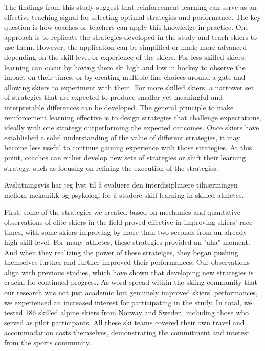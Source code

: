 The findings from this study suggest that reinforcement learning can serve as an effective teaching signal for selecting optimal strategies and performance. The key question is how coaches or teachers can apply this knowledge in practice. One approach is to replicate the strategies developed in the study and teach skiers to use them. However, the application can be simplified or made more advanced depending on the skill level or experience of the skiers. For less skilled skiers, learning can occur by having them ski high and low in hockey to observe the impact on their times, or by creating multiple line choices around a gate and allowing skiers to experiment with them. For more skilled skiers, a narrower set of strategies that are expected to produce smaller yet meaningful and interpretable differences can be developed. The general principle to make reinforcement learning effective is to design strategies that challenge expectations, ideally with one strategy outperforming the expected outcomes. Once skiers have established a solid understanding of the value of different strategies, it may become less useful to continue gaining experience with those strategies. At this point, coaches can either develop new sets of strategies or shift their learning strategy, such as focusing on refining the execution of the strategies. 




Avslutningsvis har jeg lyst til å evaluere den interdisiplinære tilnærmingen mellom mekanikk og psykologi for å studere skill learning in skilled athletes. 


First, some of the strategies we created based on mechanics and quantative observations of elite skiers in the field proved effective in improving skiers' race times, with some skiers improving by more than two seconds from an already high skill level. For many athletes, these strategies provided an "aha" moment. And when they realizing the power of these strateiges, they began pushing themselves further and further improved their performances. Our observations align with previous studies, which have shown that developing new strategies is crucial for continued progress. As word spread within the skiing community that our research was not just academic but genuinely improved skiers' performances, we experienced an increased interest for participating in the study. In total, we tested 186 skilled alpine skiers from Norway and Sweden, including those who served as pilot participants. All these ski teams covered their own travel and accommodation costs themselves, demonstrating the commitment and interest from the sports community. 

